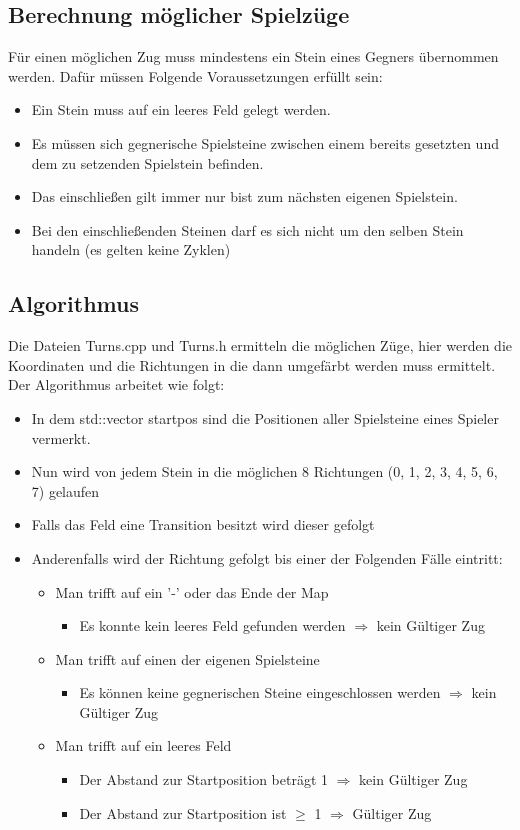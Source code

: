 \documentclass[12pt,a4paper,bibliography=totocnumbered,listof=totocnumbered]{scrartcl}
\begin{document}
\subsection{Berechnung möglicher Spielzüge}
Für einen möglichen Zug muss mindestens ein Stein eines Gegners übernommen werden. Dafür müssen Folgende Voraussetzungen erfüllt sein:
\begin{itemize}
	\item Ein Stein muss auf ein leeres Feld gelegt werden.
	\item Es müssen sich gegnerische Spielsteine zwischen einem bereits gesetzten und dem zu setzenden Spielstein befinden.
	\item Das einschließen gilt immer nur bist zum nächsten eigenen Spielstein.
	\item Bei den einschließenden Steinen darf es sich nicht um den selben Stein handeln (es gelten keine Zyklen)
\end{itemize}


\subsection{Algorithmus}
Die Dateien Turns.cpp und Turns.h ermitteln die möglichen Züge, hier werden die Koordinaten und die Richtungen in die dann umgefärbt werden muss ermittelt.
Der Algorithmus arbeitet wie folgt:
\begin{itemize}
\item In dem std::vector startpos sind die Positionen aller Spielsteine eines Spieler vermerkt.
\item Nun wird von jedem Stein in die möglichen 8 Richtungen (0, 1, 2, 3, 4, 5, 6, 7) gelaufen
\item Falls das Feld eine Transition besitzt wird dieser gefolgt
\item Anderenfalls wird der Richtung gefolgt bis einer der Folgenden Fälle eintritt:
\begin{itemize}
\item Man trifft auf ein '-' oder das Ende der Map
\begin{itemize}
\item Es konnte kein leeres Feld gefunden werden $\Rightarrow$ kein Gültiger Zug
\end{itemize}
\item Man trifft auf einen der eigenen Spielsteine
\begin{itemize}
\item Es können keine gegnerischen Steine eingeschlossen werden $\Rightarrow$ kein Gültiger Zug
\end{itemize}
\item Man trifft auf ein leeres Feld
\begin{itemize}
\item Der Abstand zur Startposition beträgt 1 $\Rightarrow$ kein Gültiger Zug
\item Der Abstand zur Startposition ist $\ge$ 1 $\Rightarrow$ Gültiger Zug
\end{itemize}
\end{itemize}
\end{itemize}
\end{document}
